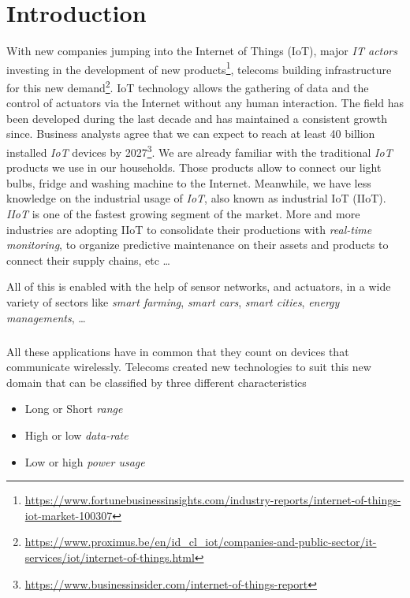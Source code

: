 \chapter{Introduction}

With new companies jumping into the Internet of Things (IoT), 
major \emph{IT actors} investing in the development of new
products\footnote{\url{https://www.fortunebusinessinsights.com/industry-reports/internet-of-things-iot-market-100307}},
 telecoms building infrastructure for this new 
demand\footnote{\url{https://www.proximus.be/en/id_cl_iot/companies-and-public-sector/it-services/iot/internet-of-things.html}}.
IoT technology allows the gathering of data and the control of actuators via
the Internet without any human interaction.
The field has been developed during the last decade and has maintained a
consistent growth since.
Business analysts agree that we can expect to reach at least 40 billion
installed \emph{IoT} devices by
2027\footnote{\url{https://www.businessinsider.com/internet-of-things-report}}. 
We are already familiar with the traditional \emph{IoT} products
we use in our households. Those products allow to connect our light bulbs, fridge and
washing machine to the Internet.
Meanwhile, we have less knowledge on the industrial usage of \emph{IoT}, also
known as industrial IoT (IIoT). \emph{IIoT} is one of the fastest growing
segment of the market.
More and more industries are adopting IIoT to consolidate their productions
with \emph{real-time monitoring}, to organize predictive maintenance on their
assets and products to connect their supply chains, etc \ldots

All of this is enabled with the help of sensor networks, and actuators, in a
wide variety of sectors like \emph{smart farming}, \emph{smart cars},
\emph{smart cities}, \emph{energy managements}, \ldots

\paragraph{}

All these applications have in common that they count on devices that
communicate wirelessly.
Telecoms created new technologies to suit this new domain that can be
classified by three different characteristics

\begin{itemize}
    \item Long or Short \emph{range}
    \item High or low \emph{data-rate}
    \item Low or high \emph{power usage} 
\end{itemize}

